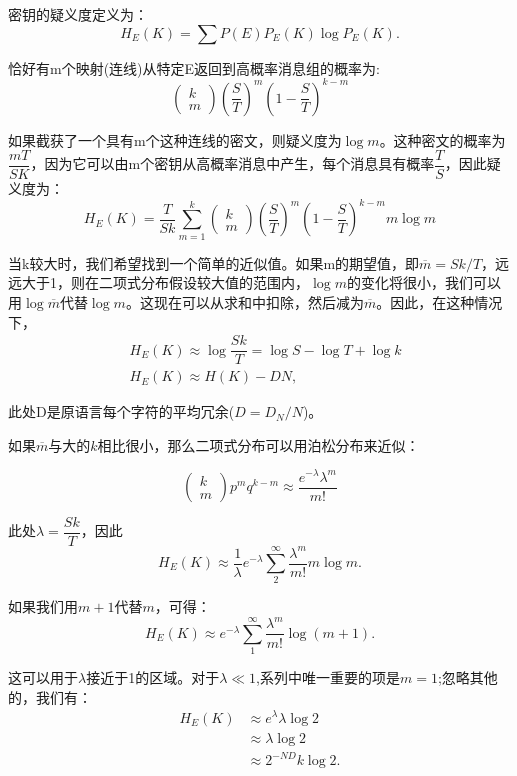 \documentclass[]{article}
\begin{document}
密钥的疑义度定义为：
\[H_E(K)=\sum {P(E) P_E(K) \log{P_E(K)}}.\]

恰好有m个映射(连线)从特定E返回到高概率消息组的概率为:
\[
\begin{pmatrix}
k\\
m
\end{pmatrix}\left(\frac{S}{T}\right)^m \left(1-\frac{S}{T}\right)^{k-m}
\]

如果截获了一个具有m个这种连线的密文，则疑义度为$\log{m}$。这种密文的概率为$\dfrac{mT}{SK}$，因为它可以由m个密钥从高概率消息中产生，每个消息具有概率$\dfrac{T}{S}$，因此疑义度为：
\[H_E(K) = \dfrac{T}{Sk} \sum_{m=1}^{k} \begin{pmatrix}
k\\
m
\end{pmatrix} \left(\dfrac{S}{T}\right)^m \left(1-\dfrac{S}{T}\right)^{k-m} m \log{m} \]

当k较大时，我们希望找到一个简单的近似值。如果m的期望值，即$\overline{m}=Sk/T$，远远大于1，则在二项式分布假设较大值的范围内，$\log{m}$的变化将很小，我们可以用$\log{\overline{m}}$代替$\log{m}$。这现在可以从求和中扣除，然后减为$\overline{m}$。因此，在这种情况下，
\begin{align*}
	&H_E(K) \approx \log{\dfrac{Sk}{T}} =\log{S}- \log{T}+\log{k}\\
	&H_E(K) \approx H(K)-DN,
\end{align*}


此处D是原语言每个字符的平均冗余($D=D_N/N$)。

如果$\overline{m}$与大的$k$相比很小，那么二项式分布可以用泊松分布来近似：

\[\begin{pmatrix}
k\\
m
\end{pmatrix}p^m q^{k-m} \approx \dfrac{e^{-\lambda} \lambda^m}{m\text{!}}
\]

此处$\lambda = \dfrac{Sk}{T}$，因此
\[H_E(K)\approx \dfrac{1}{\lambda} e^{-\lambda} \sum_{2}^{\infty} {\dfrac{\lambda^m}{m\text{!}}m \log{m}}.\]

如果我们用$m+1$代替$m$，可得：
\[H_E(K)\approx  e^{-\lambda} \sum_{1}^{\infty} {\dfrac{\lambda^m}{m\text{!}} \log{(m+1)}}.\]

这可以用于$\lambda$接近于1的区域。对于$\lambda \ll 1$,系列中唯一重要的项是$m=1$;忽略其他的，我们有：\\
\begin{align*}
H_E(K) &\approx  e^{\lambda}\lambda \log{2}\\
       &\approx  \lambda \log{2}\\
       &\approx  2^{-ND}k \log{2}.
\end{align*}
\end{document}
